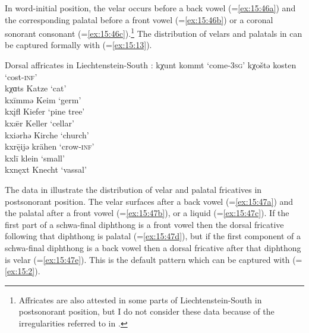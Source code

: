 In word-initial position, the velar  occurs before a back vowel (=\ref{ex:15:46a}) and the corresponding palatal before a front vowel (=\ref{ex:15:46b}) or a coronal sonorant consonant (=\ref{ex:15:46c}).\footnote{{Affricates are also attested in some parts of Liechtenstein-South  in postsonorant position, but I do not consider these data because of the irregularities referred to in \citet[207]{Jutz1925}.}} The distribution of velars and palatals in  can be captured formally with  (=\ref{ex:15:13}).

\ea\label{ex:15:46} Dorsal affricates in Liechtenstein-South :
\ea\label{ex:15:46a} kχunt \tab [kxunt] \tab kommt \tab ‘come\textsc{{}-3sg}’ 
    kχoštə \tab [kxoʃtə] \tab kosten \tab ‘cost\textsc{{}-inf}’ \\
    kχɑts \tab [kxɑts] \tab Katze \tab ‘cat’ \\
\ex\label{ex:15:46b} kxīmmə \tab [kçiːmmə] \tab Keim \tab ‘germ’ \\
    kxįfl \tab [kçɪfl̩] \tab Kiefer \tab ‘pine tree’ \\
    kxǣr \tab [kçæːr] \tab Keller \tab ‘cellar’ \\
    kxiərhə \tab [kçiərhə] \tab Kirche \tab ‘church’ \\
\ex\label{ex:15:46c} kxr\={ę}ijə \tab [kçrɛːijə] \tab krähen \tab ‘crow-\textsc{inf}’ \\
    kxlī \tab [kçliː] \tab klein \tab ‘small’ \\
    kxnęxt \tab [kçnɛçt] \tab Knecht \tab ‘vassal’ 
    \z
\z 

The data in  illustrate the distribution of velar and palatal fricatives in postsonorant position. The velar surfaces after a back vowel (=\ref{ex:15:47a}) and the palatal after a front vowel (=\ref{ex:15:47b}), or a liquid (=\ref{ex:15:47c}). If the first part of a schwa-final diphthong is a front vowel then the dorsal fricative following that diphthong is palatal (=\ref{ex:15:47d}), but if the first component of a schwa-final diphthong is a back vowel then a dorsal fricative after that diphthong is velar (=\ref{ex:15:47e}). This is the default pattern which can be captured with  (=\ref{ex:15:2}).

